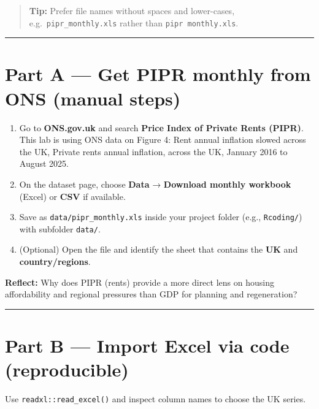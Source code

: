\documentclass[
  letterpaper,
  DIV=11,
  numbers=noendperiod]{scrreprt}
\begin{document}
\begin{quote}
\textbf{Tip:} Prefer file names without spaces and lower-cases,
e.g.~\texttt{pipr\_monthly.xls} rather than \texttt{pipr\ monthly.xls}.
\end{quote}

\begin{center}\rule{0.5\linewidth}{0.5pt}\end{center}

\section{Part A --- Get PIPR monthly from ONS (manual
steps)}\label{part-a-get-pipr-monthly-from-ons-manual-steps}

\begin{enumerate}
\def\labelenumi{\arabic{enumi}.}
\item
  Go to \textbf{ONS.gov.uk} and search \textbf{Price Index of Private
  Rents (PIPR)}. This lab is using ONS data on Figure 4: Rent annual
  inflation slowed across the UK, Private rents annual inflation, across
  the UK, January 2016 to August 2025.
\item
  On the dataset page, choose \textbf{Data} → \textbf{Download monthly
  workbook} (Excel) or \textbf{CSV} if available.
\item
  Save as \texttt{data/pipr\_monthly.xls} inside your project folder
  (e.g., \texttt{Rcoding/}) with subfolder \texttt{data/}.
\item
  (Optional) Open the file and identify the sheet that contains the
  \textbf{UK} and \textbf{country/regions}.
\end{enumerate}

\textbf{Reflect:} Why does PIPR (rents) provide a more direct lens on
housing affordability and regional pressures than GDP for planning and
regeneration?

\begin{center}\rule{0.5\linewidth}{0.5pt}\end{center}

\section{Part B --- Import Excel via code
(reproducible)}\label{part-b-import-excel-via-code-reproducible}

Use \texttt{readxl::read\_excel()} and inspect column names to choose
the UK series.
\end{document}
